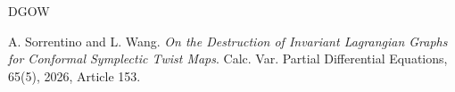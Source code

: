 \documentclass{amsart}
\begin{document}
\begin{thebibliography}{DGOW}
			
			
			
			
			
			
			 A. Sorrentino and L. Wang. {\it On the Destruction of Invariant Lagrangian Graphs for Conformal Symplectic Twist Maps}.  Calc. Var. Partial Differential Equations,
			65(5), 2026, Article 153.
			
			
			
			
			
			
			
			
			
			
			
			
			
			
		\end{thebibliography}
		
		
		
		
		
		
		
		
	
\end{document}
